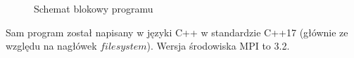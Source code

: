\documentclass[a4paper,12pt]{article}
\begin{document}
\begin{justify}
\pagebreak

\begin{figure}[h!]
\centering
{}
    \caption{Schemat blokowy programu}
\end{figure}

\pagebreak

Sam program został napisany w języki C++ w standardzie C++17 (głównie ze względu na nagłówek $filesystem$). Wersja środowiska MPI to 3.2.


\end{justify}
\end{document}
